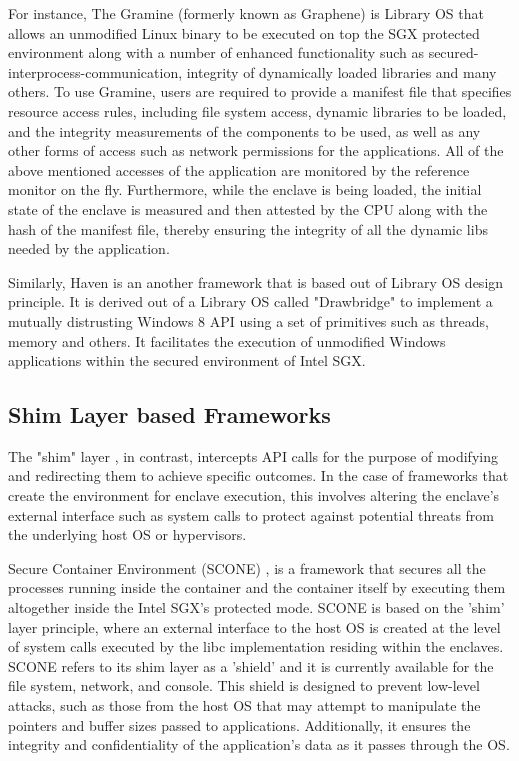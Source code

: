 \documentclass[article, doublespace,nopageskip]{VTthesis} %
\begin{document}
    For instance, The Gramine (formerly known as Graphene) \cite{Gramine} is Library OS that allows an unmodified Linux binary to be executed on top the SGX protected environment along with a number of enhanced functionality such as secured-interprocess-communication, integrity of dynamically loaded libraries and many others. To use Gramine, users are required to provide a manifest file that specifies resource access rules, including file system access, dynamic libraries to be loaded, and the integrity measurements of the components to be used, as well as any other forms of access such as network permissions for the applications. All of the above mentioned accesses of the application are monitored by the reference monitor on the fly. Furthermore, while the enclave is being loaded, the initial state of the enclave is measured and then attested by the CPU along with the hash of the manifest file, thereby ensuring the integrity of all the dynamic libs needed by the application. 

    Similarly, Haven \cite{Haven} is an another framework that is based out of Library OS design principle. It is derived out of a Library OS called "Drawbridge" \cite{Drawbridge} to implement a mutually distrusting Windows 8 API using a set of primitives such as threads, memory and others. It facilitates the execution of unmodified Windows applications within the secured environment of Intel SGX.  

    \subsection{Shim Layer based Frameworks} \label{ase:Shim Layer based Frameworks}
    The "shim" layer \cite{shim}, in contrast, intercepts API calls for the purpose of modifying and redirecting them to achieve specific outcomes. In the case of frameworks that create the environment for enclave execution, this involves altering the enclave's external interface such as system calls to protect against potential threats from the underlying host OS or hypervisors.

    Secure Container Environment (SCONE) \cite{SCONE}, is a framework that secures all the processes running inside the container and the container itself by executing them altogether inside the Intel SGX's protected mode. SCONE is based on the 'shim' layer principle, where an external interface to the host OS is created at the level of system calls executed by the libc implementation residing within the enclaves. SCONE refers to its shim layer as a 'shield' and it is currently available for the file system, network, and console. This shield is designed to prevent low-level attacks, such as those from the host OS that may attempt to manipulate the pointers and buffer sizes passed to applications. Additionally, it ensures the integrity and confidentiality of the application's data as it passes through the OS.
\end{document}
